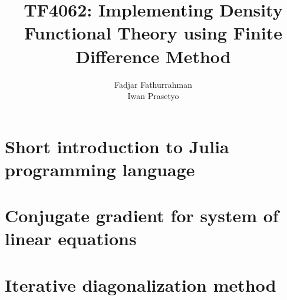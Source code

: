 \documentclass[a4paper]{article}
\begin{document}
\title{TF4062: Implementing Density Functional Theory using Finite Difference Method}
\author{Fadjar Fathurrahman \\
Iwan Prasetyo}
\date{}
\maketitle
















\appendix

\appendixpage

\section{Short introduction to Julia programming language}

\section{Conjugate gradient for system of linear equations}

\section{Iterative diagonalization method}




\end{document}
